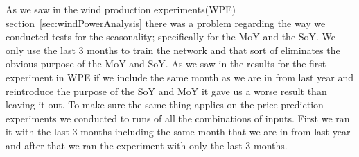 \begin{table}[H]
\centering  %
\caption{Top20(3 months) compared to 4 months run.} %
\label{table:top20comparedTo4months} %
\end{table}

As we saw in the wind production experiments(WPE) section~\ref{sec:windPowerAnalysis} there was a problem regarding the way we conducted tests for the seasonality; specifically for the MoY and the SoY. We only use the last 3 months to train the network and that sort of eliminates the obvious purpose of the MoY and SoY. As we saw in the results for the first experiment in WPE if we include the same month as we are in from last year and reintroduce the purpose of the SoY and MoY it gave us a worse result than leaving it out. To make sure the same thing applies on the price prediction experiments we conducted to runs of all the combinations of inputs. First we ran it with the last 3 months including the same month that we are in from last year and after that we ran the experiment with only the last 3 months.

